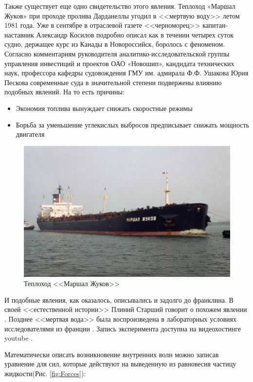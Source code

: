Также существует еще одно свидетельство этого явления. Теплоход «Маршал Жуков» при проходе пролива Дарданеллы угодил в <<мертвую воду>> летом 1981 года. Уже в сентябре в отраслевой газете <<черноморец>> капитан-наставник Александр Косилов подробно описал как в течении четырех суток судно, держащее курс из Канады в Новороссийск, боролось с феноменом. Согласно комментариям руководителя аналитико-исследовательской группы управления инвестиций и проектов ОАО «Новошип», кандидата технических наук, профессора кафедры судовождения ГМУ им. адмирала Ф.Ф. Ушакова Юрия Пескова современные суда в значительной степени подвержены влиянию подобных явлений\cite{MorVest}. На то есть причины:

\begin{itemize}
    \item Экономия топлива вынуждает снижать скоростные режимы
    \item Борьба за уменьшение углекислых выбросов предписывает снижать мощность двигателя
\end{itemize}


\begin{figure}
    \centering
    \includegraphics[scale=0.5]{Figs/marshl_jukov.jpg}
    \caption{Теплоход <<Маршал Жуков>>}
    \label{fig:jukov}
\end{figure}

И подобные явления, как оказалось, описывались и задолго до франклина. В своей <<естественной истории>> Плиний Старший говорит о похожем явлении \cite{Plinii}. Позднее <<мертвая вода>> была воспроизведена в лабораторных условиях исследователями из франции \cite{deadWater}. Запись эксперимента доступна на видеохостинге youtube \cite{deadWaterVideo}.


Математически описать возникновение внутренних волн можно записав уравнение для сил, которые действуют на выведенную из равновесия частицу жидкости(Рис. \ref{fig:Forces}):

